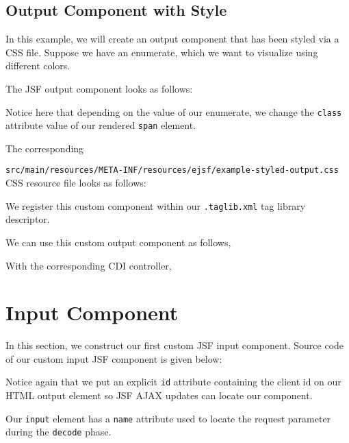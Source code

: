 \subsection{Output Component with Style}

In this example, we will create an output component that has been styled via a CSS file.
Suppose we have an enumerate, which we want to visualize using different colors.


The JSF output component looks as follows:

Notice here that depending on the value of our enumerate, we change the \texttt{class} attribute value of our rendered \texttt{span} element.

The corresponding

\texttt{src/main/resources/META-INF/resources/ejsf/example-styled-output.css} CSS resource file looks as follows:


We register this custom component within our \texttt{.taglib.xml} tag library descriptor.


We can use this custom output component as follows,


With the corresponding CDI controller,



\section{Input Component}
In this section, we construct our first custom JSF input component.
Source code of our custom input JSF component is given below:

Notice again that we put an explicit \texttt{id} attribute containing the client id on our HTML output element so JSF AJAX updates can locate our component.

Our \texttt{input} element has a \texttt{name} attribute used to locate the request parameter during the \texttt{decode} phase.

